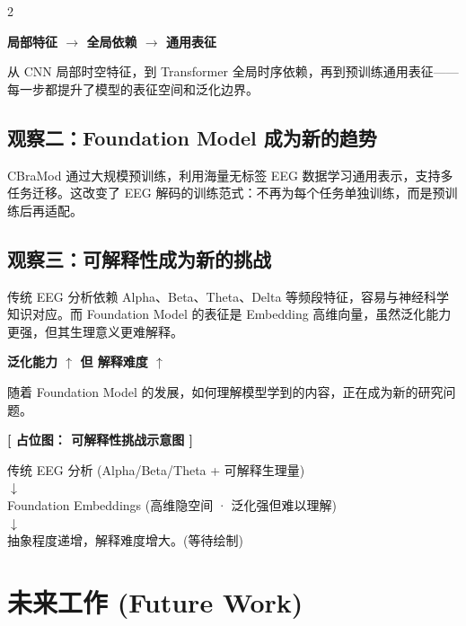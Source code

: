 \documentclass[12pt, a0paper]{article}
\renewcommand{\Large}{\fontsize{34}{42}\selectfont}
\renewcommand{\small}{\fontsize{18}{24}\selectfont}
\newcommand{\placeholder}[2]{%
    \begin{center}
    \colorbox{mygray!12}{\parbox{0.9\columnwidth}{%
        \centering
        \vspace{1.5em}
        {\Large\bfseries\color{mygray} [ 占位图： #1 ]}
        \vspace{0.8em}

        {\small\color{mygray} #2}
        \vspace{1.5em}
    }}
    \end{center}
}
\begin{document}
\begin{multicols}{2}
\begin{center}
\Large\bfseries
局部特征 \quad $\longrightarrow$ \quad 全局依赖 \quad $\longrightarrow$ \quad 通用表征
\end{center}

从 CNN 局部时空特征，到 Transformer 全局时序依赖，再到预训练通用表征——每一步都提升了模型的表征空间和泛化边界。

\subsection{观察二：Foundation Model 成为新的趋势}

CBraMod 通过大规模预训练，利用海量无标签 EEG 数据学习通用表示，支持多任务迁移。这改变了 EEG 解码的训练范式：不再为每个任务单独训练，而是预训练后再适配。

\subsection{观察三：可解释性成为新的挑战}

传统 EEG 分析依赖 Alpha、Beta、Theta、Delta 等频段特征，容易与神经科学知识对应。而 Foundation Model 的表征是 Embedding 高维向量，虽然泛化能力更强，但其生理意义更难解释。

\begin{center}
\colorbox{myorange!10}{\parbox{0.9\columnwidth}{\centering\bfseries
    泛化能力 $\uparrow$ \hspace{2em} 但 \hspace{2em} 解释难度 $\uparrow$
}}
\end{center}

随着 Foundation Model 的发展，如何理解模型学到的内容，正在成为新的研究问题。

\placeholder{可解释性挑战示意图}{%
    传统 EEG 分析 (Alpha/Beta/Theta + 可解释生理量)\\
    $\downarrow$\\
    Foundation Embeddings (高维隐空间 · 泛化强但难以理解)\\
    $\downarrow$\\
    抽象程度递增，解释难度增大。\quad (等待绘制)}

\section{未来工作 (Future Work)}


\end{multicols}
\end{document}
